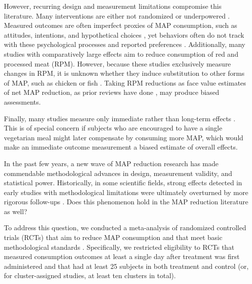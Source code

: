 \documentclass[sn-nature,referee,pdflatex]{sn-jnl}
\begin{document}
However, recurring design and measurement limitations compromise this
literature. Many interventions are either not randomized
\citep{garnett2020} or underpowered \citep{delichatsios2001}. Measured
outcomes are often imperfect proxies of MAP consumption, such as
attitudes, intentions, and hypothetical choices
\citep{raghoebar2020, vermeer2010}, yet behaviors often do not track
with these psychological processes
\citep{mathur2021effectiveness, porat2024} and reported preferences
\citep{hensher2010}. Additionally, many studies with comparatively large
effects aim to reduce consumption of red and processed meat (RPM).
However, because these studies exclusively measure changes in RPM, it is
unknown whether they induce substitution to other forms of MAP, such as
chicken or fish \citep{grummon2023}. Taking RPM reductions as face value
estimates of net MAP reduction, as prior reviews have done
\citep{bianchi2018conscious, chang2023, kwasny2022}, may produce biased
assessments.

Finally, many studies measure only immediate rather than long-term
effects \citep{hansen2021, griesoph2021}. This is of special concern if
subjects who are encouraged to have a single vegetarian meal might later
compensate by consuming more MAP, which would make an immediate outcome
measurement a biased estimate of overall effects.

In the past few years, a new wave of MAP reduction research has made
commendable methodological advances in design, measurement validity, and
statistical power. Historically, in some scientific fields, strong
effects detected in early studies with methodological limitations were
ultimately overturned by more rigorous follow-ups
\citep{wykes2008, paluck2019, scheel2021}. Does this phenomenon hold in
the MAP reduction literature as well?

To address this question, we conducted a meta-analysis of randomized
controlled trials (RCTs) that aim to reduce MAP consumption and that
meet basic methodological standards
\citep{andersson2021, kanchanachitra2020, abrahamse2007, acharya2004, banerjee2019, bianchi2022, bochmann2017, bschaden2020, carfora2023, cooney2014, cooney2016, feltz2022, haile2021, hatami2018, hennessy2016, jalil2023, mathur2021effectiveness, merrill2009, norris2014, peacock2017, polanco2022, sparkman2021, weingarten2022, piester2020, aberman2018, aldoh2023, allen2002, camp2019, coker2022, sparkman2020, berndsen2005, bertolaso2015, fehrenbach2015, mattson2020, shreedhar2021}.
Specifically, we restricted eligibility to RCTs that measured
consumption outcomes at least a single day after treatment was first
administered and that had at least 25 subjects in both treatment and
control (or, for cluster-assigned studies, at least ten clusters in
total).
\end{document}
